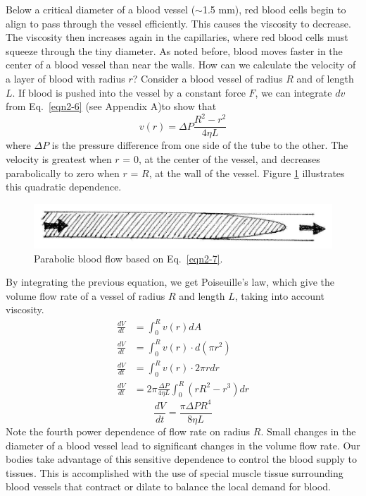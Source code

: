 Below a critical diameter of a blood vessel ($\sim$1.5 mm), red blood cells begin to align to pass through the vessel efficiently.  This causes the viscosity to decrease.  The viscosity then increases again in the capillaries, where red blood cells must squeeze through the tiny diameter.
As noted before, blood moves faster in the center of a blood vessel than near the walls.  How can we calculate the velocity of a layer of blood with radius $r$?  Consider a blood vessel of radius $R$ and of length $L$.  If blood is pushed into the vessel by a constant force $F$, we can integrate $dv$ from Eq.~\ref{eqn2-6} (see Appendix A)to show that 
\begin{equation}\label{eqn2-7}
v(r)=\Delta P\frac{R^2-r^2}{4\eta L}
\end{equation}
where $\Delta P$ is the pressure difference from one side of the tube to the other.  The velocity is greatest when $r$ = 0, at the center of the vessel, and decreases parabolically to zero when $r$ = $R$, at the wall of the vessel.  Figure \ref{Fig2-10} illustrates this quadratic dependence.  
\begin{figure}[htbp]
	\centering
	\includegraphics[width=\textwidth]{./figures/Topic2/Fig2-9.jpg}
	\caption{Parabolic blood flow based on Eq.~\ref{eqn2-7}.}
	\label{Fig2-10}
\end{figure}
By integrating the previous equation, we get Poiseuille’s law, which give the volume flow rate of a vessel of radius $R$ and length $L$, taking into account viscosity.
\begin{align}
\frac{dV}{dt} &= \int_0^R v(r) dA\nonumber\\
\frac{dV}{dt} &= \int_0^R v(r)\cdot d\left(\pi r^2\right)\nonumber\\
\frac{dV}{dt} &= \int_0^R v(r)\cdot 2\pi r dr\nonumber\\
\frac{dV}{dt} &= 2\pi \frac{\Delta P}{4\eta L}\int_0^R \left(rR^2 - r^3\right)dr\nonumber
\end{align}
\begin{equation}\label{eqn2-8}
\frac{dV}{dt} = \frac{\pi\Delta P R^4}{8\eta L}
\end{equation}
Note the fourth power dependence of flow rate on radius $R$.  Small changes in the diameter of a blood vessel lead to significant changes in the volume flow rate.  Our bodies take advantage of this sensitive dependence to control the blood supply to tissues. This is accomplished with the use of special muscle tissue surrounding blood vessels that contract or dilate to balance the local demand for blood.  
